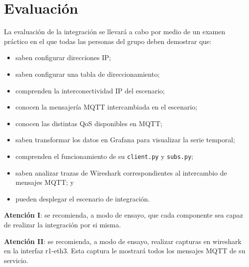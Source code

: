 \documentclass{upmassignment}
\begin{document}
\section*{Evaluación}
La evaluación de la integración
se llevará a cabo por medio de un examen
práctico en el que todas las personas del
grupo deben demostrar que:
\begin{itemize}
    \item saben configurar direcciones IP;
    \item saben configurar una tabla
        de direccionamiento;
    \item comprenden la interconectividad
        IP del escenario;
    \item conocen la mensajería MQTT
        intercambiada en el escenario;
    \item conocen las distintas QoS disponibles
        en MQTT;
    \item saben transformar los datos en
        Grafana para visualizar la
        serie temporal;
    \item comprenden el funcionamiento
        de su \texttt{client.py}
        y \texttt{subs.py};
    \item saben analizar trazas de
        Wireshark correspondientes al
        intercambio de mensajes MQTT; y
    \item pueden desplegar el escenario
        de integración.
\end{itemize}



\begin{tcolorbox}
    \textbf{Atención I}: se recomienda,
    a modo de ensayo, que cada componente
    sea capaz de realizar la integración
    por si misma.

    \textbf{Atención II}: se recomienda,
    a modo de ensayo, realizar capturas
    en wireshark en la interfaz
    r1-eth3. Esta captura le mostrará
    todos los mensajes MQTT de su servicio.
\end{tcolorbox}
\end{document}
